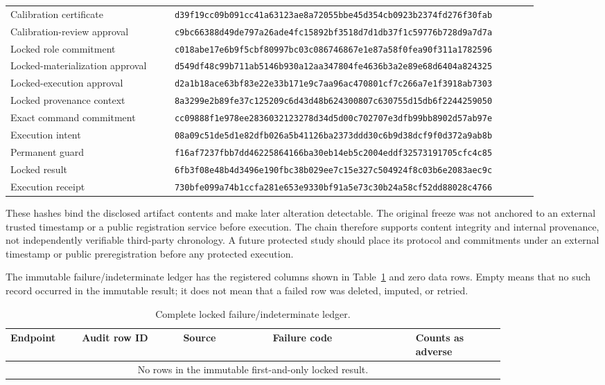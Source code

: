 \begin{longtable}{p{0.29\linewidth}p{0.62\linewidth}}
Calibration certificate & \nolinkurl{d39f19cc09b091cc41a63123ae8a72055bbe45d354cb0923b2374fd276f30fab}\\
Calibration-review approval & \nolinkurl{c9bc66388d49de797a26ade4fc15892bf3518d7d1db37f1c59776b728d9a7d7a}\\
Locked role commitment & \nolinkurl{c018abe17e6b9f5cbf80997bc03c086746867e1e87a58f0fea90f311a1782596}\\
Locked-materialization approval & \nolinkurl{d549df48c99b711ab5146b930a12aa347804fe4636b3a2e89e68d6404a824325}\\
Locked-execution approval & \nolinkurl{d2a1b18ace63bf83e22e33b171e9c7aa96ac470801cf7c266a7e1f3918ab7303}\\
Locked provenance context & \nolinkurl{8a3299e2b89fe37c125209c6d43d48b624300807c630755d15db6f2244259050}\\
Exact command commitment & \nolinkurl{cc09888f1e978ee2836032123278d34d5d00c702707e3dfb99bb8902d57ab97e}\\
Execution intent & \nolinkurl{08a09c51de5d1e82dfb026a5b41126ba2373ddd30c6b9d38dcf9f0d372a9ab8b}\\
Permanent guard & \nolinkurl{f16af7237fbb7dd46225864166ba30eb14eb5c2004eddf32573191705cfc4c85}\\
Locked result & \nolinkurl{6fb3f08e48b4d3496e190fbc38b029ee7c15e327c504924f8c03b6e2083aec9c}\\
Execution receipt & \nolinkurl{730bfe099a74b1ccfa281e653e9330bf91a5e73c30b24a58cf52dd88028c4766}\\
\bottomrule
\end{longtable}
\endgroup

These hashes bind the disclosed artifact contents and make later alteration detectable. The
original freeze was not anchored to an external trusted timestamp or a public registration
service before execution. The chain therefore supports content integrity and internal provenance,
not independently verifiable third-party chronology. A future protected study should place its
protocol and commitments under an external timestamp or public preregistration before any
protected execution.

The immutable failure/indeterminate ledger has the registered columns shown in
Table~\ref{tab:empty-failure-ledger} and zero data rows. Empty means that no such record occurred
in the immutable result; it does not mean that a failed row was deleted, imputed, or retried.

\begin{table}[ht]
\centering
\scriptsize
\caption{Complete locked failure/indeterminate ledger.}
\label{tab:empty-failure-ledger}
\begin{tabular}{p{0.12\linewidth}p{0.17\linewidth}p{0.15\linewidth}
p{0.24\linewidth}p{0.15\linewidth}}
\toprule
Endpoint & Audit row ID & Source & Failure code & Counts as adverse\\
\midrule
\multicolumn{5}{c}{No rows in the immutable first-and-only locked result.}\\
\bottomrule
\end{tabular}
\end{table}
\enlargethispage{3\baselineskip}

